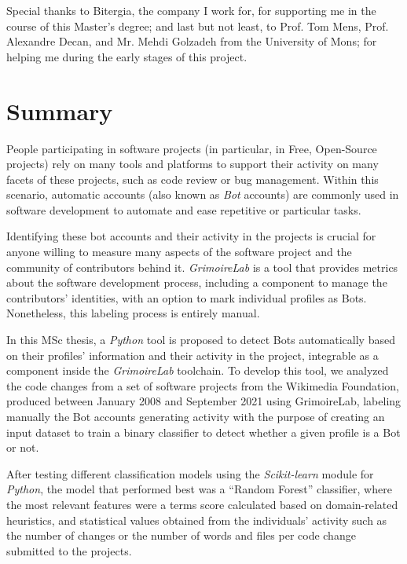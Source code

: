 \documentclass[a4paper, 12pt]{book}
\begin{document}
Special thanks to Bitergia, the company I work for, for supporting me in the course of this Master's degree; and last but not least, to Prof. Tom Mens, Prof. Alexandre Decan, and Mr. Mehdi Golzadeh from the University of Mons; for helping me during the early stages of this project.




\chapter*{Summary}

People participating in software projects (in particular, in Free, Open-Source projects) rely on many tools and platforms to support their activity on many facets of these projects, such as code review or bug management. Within this scenario, automatic accounts (also known as \emph{Bot} accounts) are commonly used in software development to automate and ease repetitive or particular tasks.

Identifying these bot accounts and their activity in the projects is crucial for anyone willing to measure many aspects of the software project and the community of contributors behind it. \emph{GrimoireLab} is a tool that provides metrics about the software development process, including a component to manage the contributors' identities, with an option to mark individual profiles as Bots. Nonetheless, this labeling process is entirely manual.

In this MSc thesis, a \emph{Python} tool is proposed to detect Bots automatically based on their profiles' information and their activity in the project, integrable as a component inside the \emph{GrimoireLab} toolchain. To develop this tool, we analyzed the code changes from a set of software projects from the Wikimedia Foundation, produced between January 2008 and September 2021 using GrimoireLab, labeling manually the Bot accounts generating activity with the purpose of creating an input dataset to train a binary classifier to detect whether a given profile is a Bot or not.

After testing different classification models using the \emph{Scikit-learn} module for \emph{Python}, the model that performed best was a ``Random Forest'' classifier, where the most relevant features were a terms score calculated based on domain-related heuristics, and statistical values obtained from the individuals' activity such as the number of changes or the number of words and files per code change submitted to the projects.
\end{document}
